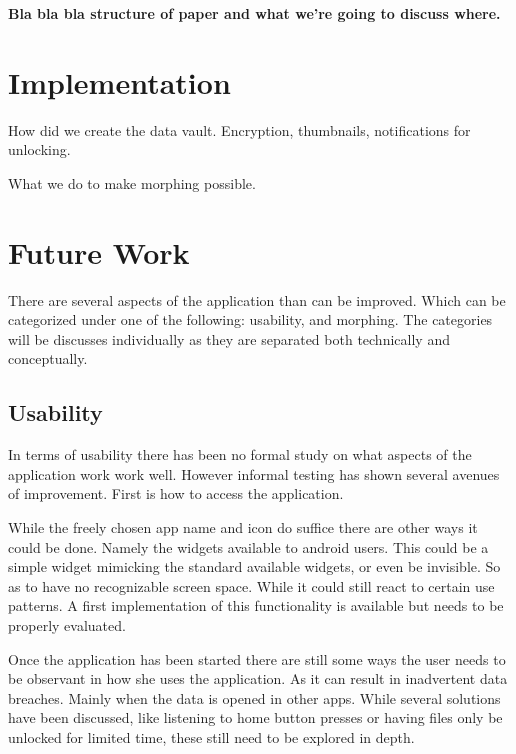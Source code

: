 \documentclass[twocolumn,english,compsoc,journal]{IEEEtran}
\begin{document}
\textbf{Bla bla bla structure of paper and what we're going to discuss
where.}






\section{Implementation}

How did we create the data vault. Encryption, thumbnails, notifications
for unlocking.

What we do to make morphing possible.





\section{Future Work}

There are several aspects of the application than can be improved. Which
can be categorized under one of the following: usability, and morphing.
The categories will be discusses individually as they are separated both
technically and conceptually. 

\subsection{Usability}

In terms of usability there has been no formal study on what aspects of
the application work work well. However informal testing has shown several
avenues of improvement. First is how to access the application. 

While the freely chosen app name and icon do suffice there are other ways 
it could be done. Namely the widgets available to android users. This could 
be a simple widget mimicking the standard available widgets, or even be 
invisible. So as to have no recognizable screen space. While it could still
react to certain use patterns. A first implementation of this functionality is
available but needs to be properly evaluated.

Once the application has been started there are still some ways the user
needs to be observant in how she uses the application. As it can result in
inadvertent data breaches. Mainly when the data is opened in other apps.
While several solutions have been discussed, like listening to home button
presses or having files only be unlocked for limited time, these still need
to be explored in depth.
\end{document}
